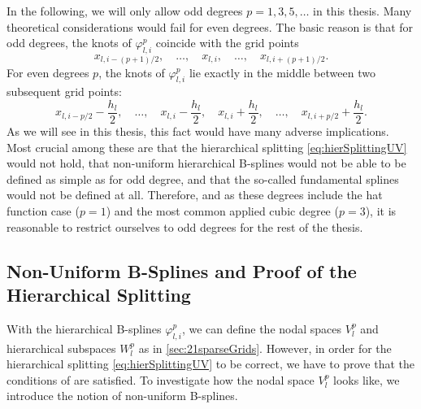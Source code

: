 In the following, we will only allow odd degrees $p = 1, 3, 5, \dotsc$
in this thesis.
Many theoretical considerations would fail for even degrees.
The basic reason is that for odd degrees, the knots of
$\varphi_{l,i}^p$ coincide with the grid points
\begin{equation}
  x_{l,i-(p+1)/2},\quad
  \dotsc,\quad
  x_{l,i},\quad
  \dotsc,\quad
  x_{l,i+(p+1)/2}.
\end{equation}
For even degrees $p$, the knots of $\varphi_{l,i}^p$ lie exactly in
the middle between two subsequent grid points:
\begin{equation}
  x_{l,i-p/2} - \frac{h_l}{2},\quad
  \dotsc,\quad
  x_{l,i} - \frac{h_l}{2},\quad
  x_{l,i} + \frac{h_l}{2},\quad
  \dotsc,\quad
  x_{l,i+p/2} + \frac{h_l}{2}.
\end{equation}
As we will see in this thesis,
this fact would have many adverse implications.
Most crucial among these are
that the hierarchical splitting \eqref{eq:hierSplittingUV} would not hold,
that non-uniform hierarchical B-splines would not be able to be defined as
simple as for odd degree,
 and
that the so-called fundamental splines would not be defined at all.
Therefore, and
as these degrees include the hat function case ($p = 1$) and the
most common applied cubic degree ($p = 3$),
it is reasonable to restrict ourselves to odd degrees
for the rest of the thesis.



\subsection{Non-Uniform B-Splines and Proof of the Hierarchical Splitting}

With the hierarchical B-splines $\varphi_{l,i}^p$, we can define
the nodal spaces $V_l^p$ and hierarchical subspaces $W_l^p$
as in \cref{sec:21sparseGrids}.
However, in order for the hierarchical splitting \eqref{eq:hierSplittingUV}
to be correct, we have to prove that the conditions of
 are satisfied.
To investigate how the nodal space $V_l^p$ looks like,
we introduce the notion of non-uniform B-splines.

